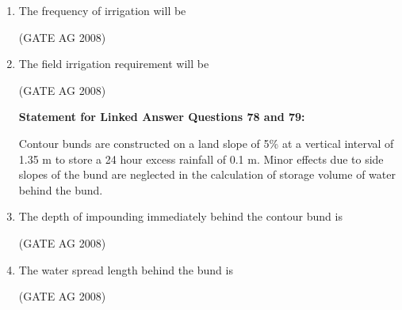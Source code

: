 \documentclass[journal,12pt,onecolumn]{IEEEtran}
\begin{document}
\begin{enumerate}
\item 
 The frequency of irrigation will be
\begin{enumerate}
\end{enumerate}
\hfill(GATE AG 2008)\\

\medskip

\item 
 The field irrigation requirement will be
\begin{enumerate}
\end{enumerate}
\hfill(GATE AG 2008)\\

\medskip


\textbf{Statement for Linked Answer Questions 78 and 79:}

Contour bunds are constructed on a land slope of 5\% at a vertical interval of 1.35 m to store a 24 hour excess rainfall of 0.1 m. Minor effects due to side slopes of the bund are neglected in the calculation of storage volume of water behind the bund.

\item 
 The depth of impounding immediately behind the contour bund is
\begin{enumerate}
\end{enumerate}
\hfill(GATE AG 2008)\\

\medskip

\item 
 The water spread length behind the bund is
\begin{enumerate}
\end{enumerate}
\hfill(GATE AG 2008)\\


\end{enumerate}
\end{document}
